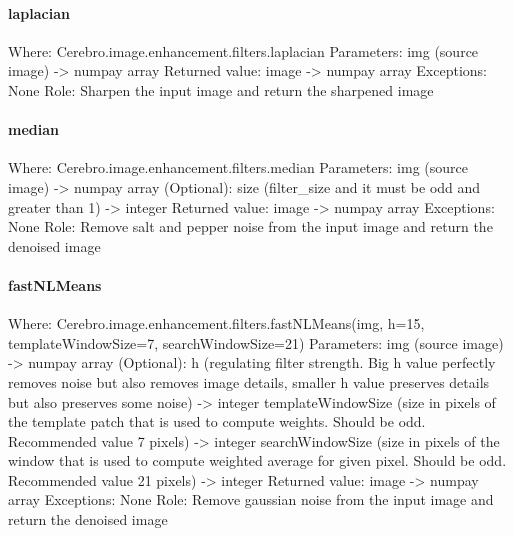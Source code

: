 \paragraph{laplacian}
Where: Cerebro.image.enhancement.filters.laplacian \newline
Parameters: img (source image) -> numpay array \newline
Returned value: image -> numpay array \newline
Exceptions: None \newline
Role: Sharpen the input image and return the sharpened image
\paragraph{median}
Where: Cerebro.image.enhancement.filters.median \newline
Parameters: img (source image) -> numpay array \newline
(Optional): size (filter_size and it must be odd and greater than 1) -> integer \newline
Returned value: image -> numpay array \newline
Exceptions: None \newline
Role: Remove salt and pepper noise from the input image and return the denoised image
\paragraph{fastNLMeans}
Where: Cerebro.image.enhancement.filters.fastNLMeans(img, h=15, templateWindowSize=7, searchWindowSize=21) \newline
Parameters: img (source image) -> numpay array \newline
(Optional): \newline
h (regulating filter strength. Big h value perfectly removes noise but also removes image details, smaller h value preserves details but also preserves some noise) -> integer \newline
templateWindowSize (size in pixels of the template patch that is used to compute weights. Should be odd. Recommended value 7 pixels) -> integer \newline
searchWindowSize (size in pixels of the window that is used to compute weighted average for given pixel. Should be odd. Recommended value 21 pixels) -> integer \newline
Returned value: image -> numpay array \newline
Exceptions: None \newline
Role: Remove gaussian noise from the input image and return the denoised image
